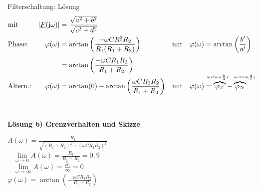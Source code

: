 \begin{frame}[allowframebreaks]
\begin{bsp}{Filterschaltung: Lösung}{}
\begin{align*}
            &\text{mit}&
            |\underline{F}(\mathrm{j}\omega)| &= \frac{\sqrt{a^2+b^2}}{\sqrt{c^2+d^2}}\\
        &\text{Phase:}&
            \varphi(\omega) &= \arctan\left(\frac{-\omega C R_1^2R_2}{R_1(R_1+R_2)}\right)&
            &\text{mit}&
            \varphi(\omega) &= \arctan\left(\frac{b'}{a'}\right)\\[+2pt]
        &&
            &= \arctan\left(\frac{-\omega C R_1R_2}{R_1+R_2}\right)\\[-4pt]
        &\text{Altern.:}&
            \varphi(\omega ) &= \arctan(0) - \arctan\left(\frac{\omega CR_1R_2}{R_1+R_2}\right)&
            &\text{mit}&
            \varphi(\omega) &= \overbrace{\varphi_{Z}}^{\mathclap{\scriptscriptstyle{\arctan(\frac{b}{a})}\ \ }} - \overbrace{\varphi_{N}}^{\mathclap{\ -\ \scriptscriptstyle{\arctan(\frac{d}{c})}}}
    \end{align*}

\b{\framebreak}%

\textbf{Lösung b) Grenzverhalten und Skizze}

    \noindent%
    \begin{minipage}{\textwidth}
        \begin{minipage}[c][6cm][c]{0.48\textwidth}

            $A(\omega) = \frac{R_1}{\sqrt{(R_1+R_2)^2+(\omega CR_1R_2)^2}}$ \\

            \qquad $\ \ \ \ \lim \limits_{\omega \to 0} A(\omega) = \frac{R_1}{R_1+R_2} = 0,9$\\
            
            \qquad $\ \ \ \ \lim \limits_{\omega \to \infty} A(\omega) = \frac{R_1}{\infty} = 0$\\
            
            $\varphi(\omega) = \arctan(-\frac{\omega CR_1R_2}{R_1+R_2})$\\


\end{minipage}
\end{minipage}
\end{bsp}
\end{frame}
